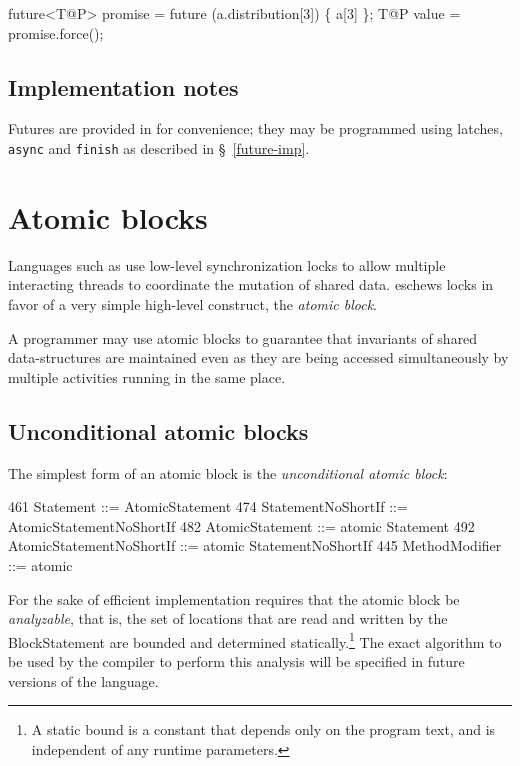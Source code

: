 \begin{x10}
future<T@P> promise 
     = future (a.distribution[3]) \{ a[3] \};
T@P value = promise.force();
\end{x10}

\subsection{Implementation notes}
Futures are provided in \Xten{} for convenience; they may be
programmed using latches, {\tt async} and {\tt finish} as
described in \S~\ref{future-imp}.

\section{Atomic blocks}\label{AtomicBlocks}
Languages such as \java{} use low-level synchronization locks to allow
multiple interacting threads to coordinate the mutation of shared
data. \Xten{} eschews locks in favor of a very simple high-level
construct, the {\em atomic block}.

A programmer may use atomic blocks to guarantee that invariants of
shared data-structures are maintained even as they are being accessed
simultaneously by multiple activities running in the same place.

\subsection{Unconditional atomic blocks}
The simplest form of an atomic block is the {\em unconditional
atomic block}:

\begin{x10}
461 Statement ::= AtomicStatement
474 StatementNoShortIf ::= 
       AtomicStatementNoShortIf
482 AtomicStatement ::= atomic  Statement
492 AtomicStatementNoShortIf ::= 
       atomic StatementNoShortIf
445 MethodModifier ::= atomic
\end{x10}

For the sake of efficient implementation \XtenCurrVer{} requires
that the atomic block be {\em analyzable}, that is, the set of
locations that are read and written by the {\cf BlockStatement} are
bounded and determined statically.\footnote{ A static bound is a constant
that depends only on the program text, and is independent 
of any runtime parameters. }
The exact algorithm to be used by
the compiler to perform this analysis will be specified in future
versions of the language.

